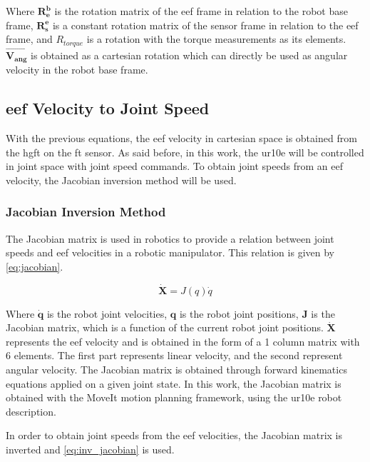 \noindent Where $\mathbf{R^b_e}$ is the rotation matrix of the \ac{eef} frame in relation to the robot base frame, $\mathbf{R^e_s}$ is a constant rotation matrix of the sensor frame in relation to the \ac{eef} frame, and $R_{torque}$ is a rotation with the torque measurements as its elements. $\vec{\mathbf{V_{ang}}}$ is obtained as a cartesian rotation which can directly be used as angular velocity in the robot base frame.



\subsection{\ac{eef} Velocity to Joint Speed}
\label{ssec:eef_to_js}

\par With the previous equations, the \ac{eef} velocity in cartesian space is obtained from the \ac{hgft} on the \ac{ft} sensor. As said before, in this work, the \ac{ur10e} will be controlled in joint space with joint speed commands. To obtain joint speeds from an \ac{eef} velocity, the Jacobian inversion method will be used.

\subsubsection{Jacobian Inversion Method}

\par The Jacobian matrix is used in robotics to provide a relation between joint speeds and \ac{eef} velocities in a robotic manipulator. This relation is given by \autoref{eq:jacobian}.

\begin{equation}
    \dot{\mathbf{X}} = J(q)\dot{q}
    \label{eq:jacobian}
\end{equation}

\noindent Where $\dot{\mathbf{q}}$ is the robot joint velocities, $\mathbf{q}$ is the robot joint positions, $\mathbf{J}$ is the Jacobian matrix, which is a function of the current robot joint positions. $\dot{\mathbf{X}}$ represents the \ac{eef} velocity and is obtained in the form of a 1 column matrix with 6 elements. The first part represents linear velocity, and the second represent angular velocity. The Jacobian matrix is obtained through forward kinematics equations applied on a given joint state. In this work, the Jacobian matrix is obtained with the MoveIt motion planning framework, using the \ac{ur10e} robot description. 

\par In order to obtain joint speeds from the \ac{eef} velocities, the Jacobian matrix is inverted and \autoref{eq:inv_jacobian} is used.

